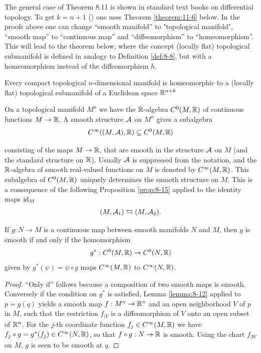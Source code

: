 \begin{remark}\label{remark:8-13}
  The general case of Theorem 8.11 is shown in standard text books
on differential topology. To get $k = n + 1$ ()
one uses Theorem \ref{theorem:11-6} below. In the proofs above one can change ``smooth
manifold'' to "topological manifold", ``smooth map'' to ``continuous map'' and
``diffeomorphism'' to ``homeomorphism''. This will lead to the theorem below,
where the concept (locally flat) topological submanifold is defined in analogy to
Definition \ref{def:8-8}, but with a homeomorphism instead of the diffeomorphism $h$.
\end{remark}

\begin{theorem}\label{theorem:8-14}
  Every compact topological $n$-dimensional manifold is homeomorphic to a (locally flat) 
  topological submanifold of a Euclidean space $\mathbb{R}^{n+k}$
\end{theorem}

On a topological manifold $M^n$ we have the $\mathbb{R}$-algebra $C^0(M, \mathbb{R})$ of continuous
functions $M\to\mathbb{R}$. A smooth structure $\mathcal{A}$ on $M^n$ gives a subalgebra
\begin{align*}
  C^\infty((M, \mathcal{A}), \mathbb{R})\subseteq C^0(M, \mathbb{R})
\end{align*}

consisting of the maps $M\to \mathbb{R}$, that are smooth in the structure $\mathcal{A}$ on $M$ (and
the standard structure on $\mathbb{R}$). Usually $\mathcal{A}$ is suppressed from the notation, and the
$\mathbb{R}$-algebra of smooth real-valued functions on $M$ is denoted by $C^\infty(M, \mathbb{R})$. This
subalgebra of $C^0(M, \mathbb{R})$ uniquely determines the smooth structure on $M$. This is
a consequence of the following Proposition \ref{prop:8-15} applied to the identity maps $\operatorname{id}_M$
\begin{align*}
  (M, \mathcal{A}_1) \leftrightarrows (M, \mathcal{A}_2).
\end{align*}

\begin{proposition}\label{prop:8-15}
  If $g:N\to M$ is a continuous map between smooth manifolds $N$ and $M$, then $g$ is smooth 
  if and only if the homomorphism
  \begin{align*}
    g^*:C^0(M, \mathbb{R})\to C^0(N, \mathbb{R})
  \end{align*}
  given by $g^*(\psi) = \psi\circ g$ maps $C^\infty(M, \mathbb{R})$ to $C^\infty(N, \mathbb{R})$.
\end{proposition}

\begin{proof}
  ``Only if'' follows because a composition of two smooth maps is smooth.
  Conversely if the condition on $g^*$ is satisfied, Lemma \ref{lemma:8-12} applied to $p = g(q)$
  yields a smooth map $f:M^n\to\mathbb{R}^n$ and an open neighborhood $V$ of $p$ in $M$, such
  that the restriction $f_{|V}$ is a diffeomorphism of $V$ onto an open subset of $\mathbb{R}^n$. For the
  $j$-th coordinate function $f_j\in C^\infty(M, \mathbb{R})$ we have $f_j\circ g = g^*(f_j)\in C^\infty(N, \mathbb{R})$,
  so that $f\circ g:N\to\mathbb{R}$ is smooth. Using the chart $f_{|W}$ on $M$, $g$ is seen to be
  smooth at $q$.
\end{proof}

